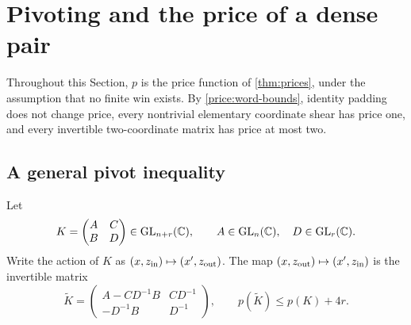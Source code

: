 \section{Pivoting and the price of a dense pair}
\label{pivot:sec:pivots}

Throughout this Section, $p$ is the price function of
\cref{thm:prices}, under the assumption that no finite win exists.
By \cref{price:word-bounds}, identity padding does not change price,
every nontrivial elementary coordinate shear has price one, and
every invertible two-coordinate matrix has price at most two.

\subsection{A general pivot inequality}

\begin{samepage}
\begin{lemma}\label{lem:pivot-bound}
Let
\[
 K=\begin{pmatrix}A&C\\ B&D\end{pmatrix}\in\operatorname{GL}_{n+r}(\mathbb C),
 \qquad A\in\operatorname{GL}_n(\mathbb C),\quad D\in\operatorname{GL}_r(\mathbb C).
\]
Write the action of $K$ as
$(x,z_{\rm in})\mapsto(x',z_{\rm out})$.
The map $(x,z_{\rm out})\mapsto(x',z_{\rm in})$ is the invertible matrix
\begin{equation}\label{pivot:eq:pivot-matrix}
 \widetilde K=
 \begin{pmatrix}
 A-CD^{-1}B&CD^{-1}\\
 -D^{-1}B&D^{-1}
 \end{pmatrix},
 \qquad p(\widetilde K)\le p(K)+4r.
\end{equation}
\end{lemma}
\end{samepage}

